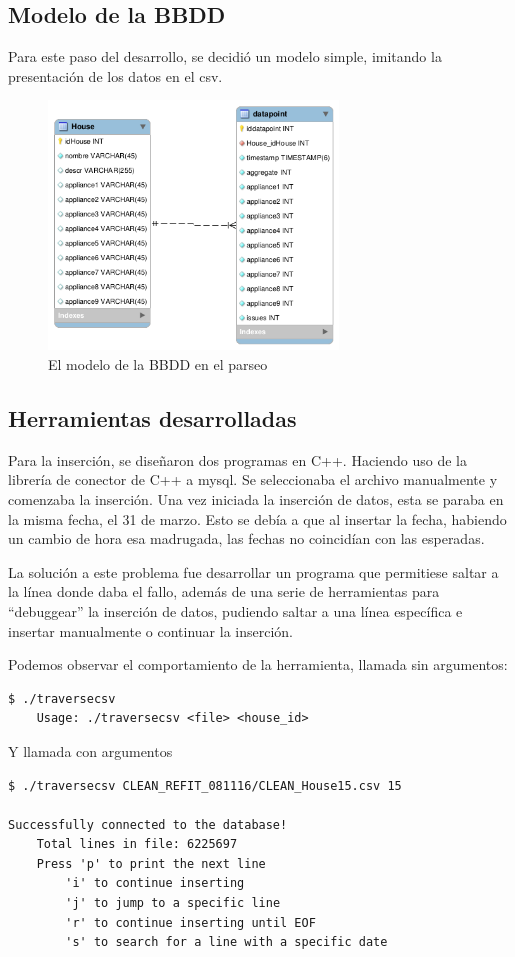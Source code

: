 \subsection{Modelo de la BBDD}
Para este paso del desarrollo, se decidió un modelo simple, imitando la presentación de los datos en el csv.
\begin{figure}[H]
    \centering
    \includegraphics[height=250px]{images/db_parsingstep.png}
    \caption{El modelo de la BBDD en el parseo}
    \label{diagramaBBDD}
\end{figure}

\subsection{Herramientas desarrolladas}
Para la inserción, se diseñaron dos programas en C++. Haciendo uso de la librería de conector de C++ a mysql. Se seleccionaba el archivo manualmente y comenzaba la inserción. 
Una vez iniciada la inserción de datos, esta se paraba en la misma fecha, el 31 de marzo. Esto se debía a que al insertar la fecha, habiendo un cambio de hora esa madrugada, las fechas no coincidían con las esperadas.

La solución a este problema fue desarrollar un programa que permitiese saltar a la línea donde daba el fallo, además de una serie de herramientas para \enquote{debuggear} la inserción de datos, pudiendo saltar a una línea específica e insertar manualmente o continuar la inserción.

Podemos observar el comportamiento de la herramienta, llamada sin argumentos:
\begin{lstlisting}[basicstyle=\ttfamily, backgroundcolor=\color{lightgray}]
    $ ./traversecsv 
    Usage: ./traversecsv <file> <house_id>
\end{lstlisting}

Y llamada con argumentos
\begin{lstlisting}[basicstyle=\ttfamily, backgroundcolor=\color{lightgray}]
$ ./traversecsv CLEAN_REFIT_081116/CLEAN_House15.csv 15
    
Successfully connected to the database!
    Total lines in file: 6225697
    Press 'p' to print the next line 
        'i' to continue inserting 
        'j' to jump to a specific line 
        'r' to continue inserting until EOF
        's' to search for a line with a specific date
\end{lstlisting}

